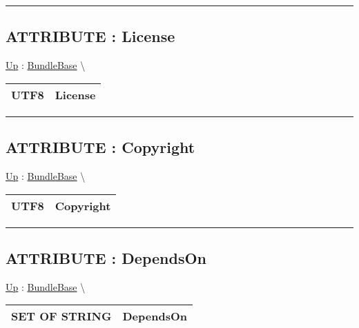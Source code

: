 \par


\rule{\linewidth}{0.5pt}
\subsection*{ATTRIBUTE : License}
\hypertarget{ecldoc:bundlebase.license}{}
\hyperlink{ecldoc:BundleBase}{Up} :
\hspace{0pt} \hyperlink{ecldoc:BundleBase}{BundleBase} \textbackslash 

{\renewcommand{\arraystretch}{1.5}
\begin{tabularx}{\textwidth}{|>{\raggedright\arraybackslash}l|X|}
\hline
\hspace{0pt}UTF8 & License \\
\hline
\end{tabularx}
}

\par


\rule{\linewidth}{0.5pt}
\subsection*{ATTRIBUTE : Copyright}
\hypertarget{ecldoc:bundlebase.copyright}{}
\hyperlink{ecldoc:BundleBase}{Up} :
\hspace{0pt} \hyperlink{ecldoc:BundleBase}{BundleBase} \textbackslash 

{\renewcommand{\arraystretch}{1.5}
\begin{tabularx}{\textwidth}{|>{\raggedright\arraybackslash}l|X|}
\hline
\hspace{0pt}UTF8 & Copyright \\
\hline
\end{tabularx}
}

\par


\rule{\linewidth}{0.5pt}
\subsection*{ATTRIBUTE : DependsOn}
\hypertarget{ecldoc:bundlebase.dependson}{}
\hyperlink{ecldoc:BundleBase}{Up} :
\hspace{0pt} \hyperlink{ecldoc:BundleBase}{BundleBase} \textbackslash 

{\renewcommand{\arraystretch}{1.5}
\begin{tabularx}{\textwidth}{|>{\raggedright\arraybackslash}l|X|}
\hline
\hspace{0pt}SET OF STRING & DependsOn \\
\hline
\end{tabularx}
}

